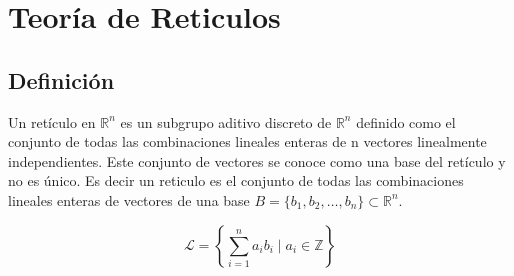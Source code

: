 
\chapter{Teoría de Reticulos}

\section{Definición}

Un retículo en $\mathbb{R}^n$ es un subgrupo aditivo discreto de $\mathbb{R}^n$ definido como el conjunto de todas las combinaciones lineales enteras de n vectores linealmente independientes. Este conjunto de vectores se conoce como una base del retículo y no es único. Es decir un reticulo es el conjunto de todas las combinaciones lineales enteras de vectores de una base $B=\{b_1,b_2,\ldots,b_n\} \subset \mathbb{R}^n$.

\begin{equation}
    \mathcal{L} = \left\{ \sum_{i=1}^{n} a_i b_i \mid a_i \in \mathbb{Z} \right\}
\end{equation}


\endinput
